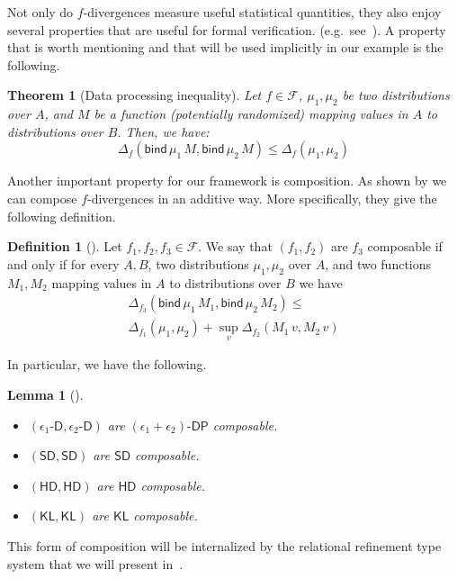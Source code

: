 \documentclass{sig-alternate-05-2015}
\theoremstyle{plain}
\newtheorem{lemma}{Lemma}[section]
\newtheorem{theorem}{Theorem}[section]
\theoremstyle{definition}
\newtheorem{definition}{Definition}[section]
\theoremstyle{corollary}
\newcommand{\fdiv}{\ensuremath{f}}
\begin{document}
Not only do $\fdiv$-divergences measure useful statistical quantities, they also
enjoy several properties that are useful for formal verification.
(e.g.~see~\citep{csiszarS04}). 
A property that is worth mentioning and that will be used
implicitly in our example is the following.
\begin{theorem}[Data processing inequality]
\label{lem:data-processing}
  Let $\fdiv\in\mathcal{F}$, $\mu_1,\mu_2$ be two distributions over
  $A$, and $M$ be a function (potentially randomized)  mapping values in $A$ to
  distributions over $B$. Then, we have:
$$
\Delta_{\fdiv}(\mathsf{bind}\, \mu_1\, M,\mathsf{bind}\, \mu_2\,
M)\leq \Delta_{\fdiv}(\mu_1,\mu_2)
$$
\end{theorem}
Another important property for our framework is
composition. As shown by \citet{BartheO13} we can compose
\fdiv-divergences in an additive way. 
More specifically, they give the following definition.
\begin{definition}[\citet{BartheO13}]
  Let $\fdiv_1,\fdiv_2,\fdiv_3\in\mathcal{F}$. We say that
  $(\fdiv_1,\fdiv_2)$ are $\fdiv_3$ composable if and only if for
  every $A,B$, two distributions $\mu_1,\mu_2$ over $A$, and two functions
  $M_1,M_2$ mapping values in $A$ to distributions over $B$ we have
\begin{multline*}
\Delta_{\fdiv_3}(\mathsf{bind}\, \mu_1\, M_1,\mathsf{bind}\, \mu_2\,
M_2)\leq\\ \Delta_{\fdiv_1}(\mu_1,\mu_2)+\sup_v\Delta_{\fdiv_2}(M_1\,
v,M_2\, v)
\end{multline*}
\end{definition}
In particular, we have the following.
\begin{lemma}[\citet{BartheO13}]$ $
  \begin{itemize}
  \item $(\epsilon_1\text{-}\mathsf{D}, \epsilon_2\text{-}\mathsf{D})$ are
    $(\epsilon_1+\epsilon_2)\text{-}\mathsf{DP}$ composable.
  \item $(\mathsf{SD}, \mathsf{SD})$ are
    $\mathsf{SD}$ composable.
  \item $(\mathsf{HD}, \mathsf{HD})$ are
    $\mathsf{HD}$ composable.
  \item $(\mathsf{KL}, \mathsf{KL})$ are
    $\mathsf{KL}$ composable.
  \end{itemize}
\end{lemma}
This form of composition will be
internalized by the relational refinement type system that we will present
in~. 
\end{document}
